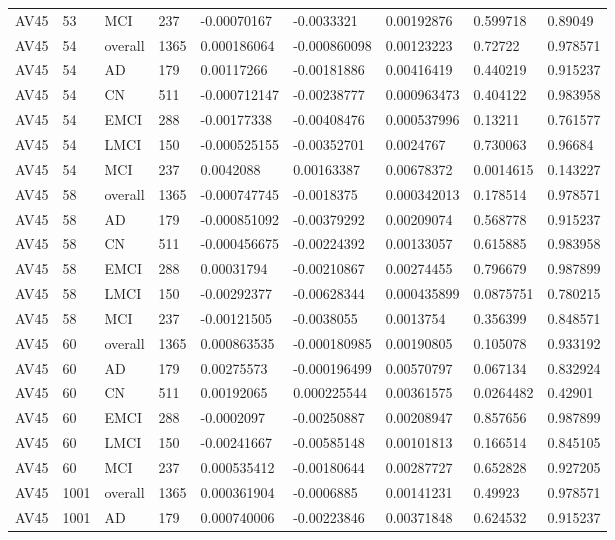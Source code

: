 \begin{landscape}
\begin{longtable}{lllllllll}
AV45 & 53 & MCI & 237 & -0.00070167 & -0.0033321 & 0.00192876 & 0.599718 & 0.89049 \\
AV45 & 54 & overall & 1365 & 0.000186064 & -0.000860098 & 0.00123223 & 0.72722 & 0.978571 \\
AV45 & 54 & AD & 179 & 0.00117266 & -0.00181886 & 0.00416419 & 0.440219 & 0.915237 \\
AV45 & 54 & CN & 511 & -0.000712147 & -0.00238777 & 0.000963473 & 0.404122 & 0.983958 \\
AV45 & 54 & EMCI & 288 & -0.00177338 & -0.00408476 & 0.000537996 & 0.13211 & 0.761577 \\
AV45 & 54 & LMCI & 150 & -0.000525155 & -0.00352701 & 0.0024767 & 0.730063 & 0.96684 \\
AV45 & 54 & MCI & 237 & 0.0042088 & 0.00163387 & 0.00678372 & 0.0014615 & 0.143227 \\
AV45 & 58 & overall & 1365 & -0.000747745 & -0.0018375 & 0.000342013 & 0.178514 & 0.978571 \\
AV45 & 58 & AD & 179 & -0.000851092 & -0.00379292 & 0.00209074 & 0.568778 & 0.915237 \\
AV45 & 58 & CN & 511 & -0.000456675 & -0.00224392 & 0.00133057 & 0.615885 & 0.983958 \\
AV45 & 58 & EMCI & 288 & 0.00031794 & -0.00210867 & 0.00274455 & 0.796679 & 0.987899 \\
AV45 & 58 & LMCI & 150 & -0.00292377 & -0.00628344 & 0.000435899 & 0.0875751 & 0.780215 \\
AV45 & 58 & MCI & 237 & -0.00121505 & -0.0038055 & 0.0013754 & 0.356399 & 0.848571 \\
AV45 & 60 & overall & 1365 & 0.000863535 & -0.000180985 & 0.00190805 & 0.105078 & 0.933192 \\
AV45 & 60 & AD & 179 & 0.00275573 & -0.000196499 & 0.00570797 & 0.067134 & 0.832924 \\
AV45 & 60 & CN & 511 & 0.00192065 & 0.000225544 & 0.00361575 & 0.0264482 & 0.42901 \\
AV45 & 60 & EMCI & 288 & -0.0002097 & -0.00250887 & 0.00208947 & 0.857656 & 0.987899 \\
AV45 & 60 & LMCI & 150 & -0.00241667 & -0.00585148 & 0.00101813 & 0.166514 & 0.845105 \\
AV45 & 60 & MCI & 237 & 0.000535412 & -0.00180644 & 0.00287727 & 0.652828 & 0.927205 \\
AV45 & 1001 & overall & 1365 & 0.000361904 & -0.0006885 & 0.00141231 & 0.49923 & 0.978571 \\
AV45 & 1001 & AD & 179 & 0.000740006 & -0.00223846 & 0.00371848 & 0.624532 & 0.915237 \\

\end{longtable}
\end{landscape}
